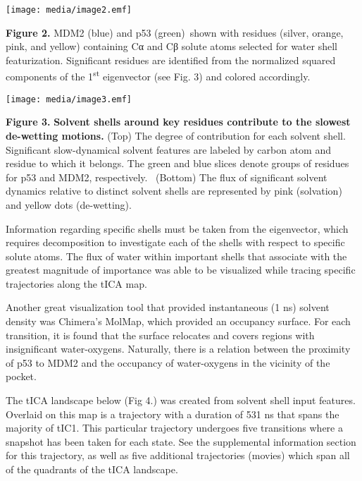 \texttt{[image: media/image2.emf]}

\textbf{Figure 2.} MDM2 (blue) and p53 (green)~shown with residues
(silver, orange, pink, and yellow) containing Cα and Cβ solute atoms
selected for water shell featurization. Significant residues are
identified from the normalized squared components of the
1\textsuperscript{st} eigenvector (see Fig. 3) and colored accordingly.

\texttt{[image: media/image3.emf]}

\textbf{Figure 3.} \textbf{Solvent shells around key residues contribute
to the slowest de-wetting motions.} (Top) The degree of contribution for
each solvent shell. Significant slow-dynamical solvent features are
labeled by carbon atom and residue to which it belongs. The green and
blue slices denote groups of residues for p53 and MDM2, respectively.~
(Bottom) The flux of significant solvent dynamics relative to distinct
solvent shells are represented by pink (solvation) and yellow dots
(de-wetting).

Information regarding specific shells must be taken from the
eigenvector, which requires decomposition to investigate each of the
shells with respect to specific solute atoms. The flux of water within
important shells that associate with the greatest magnitude of
importance was able to be visualized while tracing specific trajectories
along the tICA map.

Another great visualization tool that provided instantaneous (1 ns)
solvent density was Chimera's MolMap, which provided an occupancy
surface. For each transition, it is found that the surface relocates and
covers regions with insignificant water-oxygens. Naturally, there is a
relation between the proximity of p53 to MDM2 and the occupancy of
water-oxygens in the vicinity of the pocket.

The tICA landscape below (Fig 4.) was created from solvent shell input
features. Overlaid on this map is a trajectory with a duration of 531 ns
that spans the majority of tIC1. This particular trajectory undergoes
five transitions where a snapshot has been taken for each state. See the
supplemental information section for this trajectory, as well as five
additional trajectories (movies) which span all of the quadrants of the
tICA landscape.

